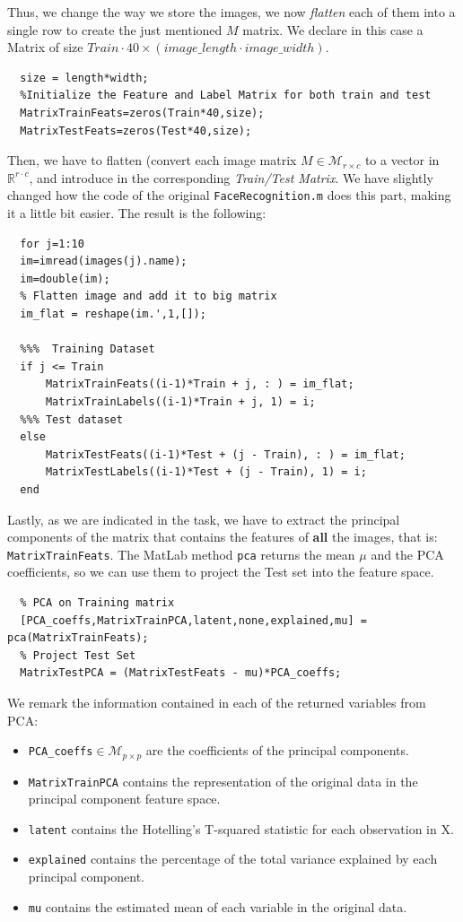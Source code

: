 \documentclass[a4paper]{article}
\def\inline{\lstinline[basicstyle=\ttfamily,keywordstyle={}]}
\begin{document}
Thus, we change the way we store the images, we now \emph{flatten} each of them into a single row to create the just mentioned \(M\) matrix. We declare in this case a Matrix of size \(Train\cdot 40 \times  (image\_length \cdot image\_width)\).

\begin{verbatim}
  size = length*width;
  %Initialize the Feature and Label Matrix for both train and test
  MatrixTrainFeats=zeros(Train*40,size); 
  MatrixTestFeats=zeros(Test*40,size); 
\end{verbatim}

Then, we have to flatten (convert each image matrix \(M \in \mathcal M_{r \times c}\) to a vector in \(\mathbb R^{r \cdot c}\), and introduce in the corresponding \emph{Train/Test Matrix}. We have slightly changed how the code of the original \inline{FaceRecognition.m} does this part, making it a little bit easier. The result is the following:

\begin{verbatim}
  for j=1:10
  im=imread(images(j).name);
  im=double(im);
  % Flatten image and add it to big matrix
  im_flat = reshape(im.',1,[]);

  %%%  Training Dataset
  if j <= Train
      MatrixTrainFeats((i-1)*Train + j, : ) = im_flat;
      MatrixTrainLabels((i-1)*Train + j, 1) = i;
  %%% Test dataset
  else
      MatrixTestFeats((i-1)*Test + (j - Train), : ) = im_flat;
      MatrixTestLabels((i-1)*Test + (j - Train), 1) = i;
  end
\end{verbatim}

Lastly, as we are indicated in the task, we have to extract the principal components of the matrix that contains the features of \textbf{all} the images, that is: \inline{MatrixTrainFeats}. The MatLab method \inline{pca} returns the mean \(\mu\) and the PCA coefficients, so we can use them to project the Test set into the feature space.
\begin{verbatim}
  % PCA on Training matrix
  [PCA_coeffs,MatrixTrainPCA,latent,none,explained,mu] = pca(MatrixTrainFeats);
  % Project Test Set
  MatrixTestPCA = (MatrixTestFeats - mu)*PCA_coeffs;  
\end{verbatim}

We remark the information contained in each of the returned variables from PCA:

\begin{itemize}
\item \inline{PCA_coeffs}\(\in \mathcal M_{p \times p}\) are the coefficients of the principal components.
\item \inline{MatrixTrainPCA} contains the representation of the original data in the principal component feature space.
\item \inline{latent} contains the  Hotelling's T-squared statistic for each observation in X.
\item \inline{explained} contains the percentage of the total variance explained by each principal component.
\item \inline{mu} contains the estimated mean of each variable in the original data.
\end{itemize}
\end{document}
